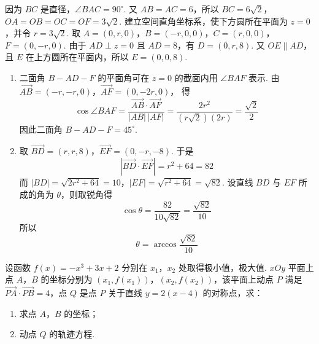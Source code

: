 \begin{solution}
因为 \(BC\) 是直径，\(\angle BAC=90^{\circ}\). 又 \(AB=AC=6\)，所以
\(BC=6\sqrt{2}\)，\(OA=OB=OC=OF=3\sqrt{2}\).
建立空间直角坐标系，使下方圆所在平面为 \(z=0\)，并令 \(r=3\sqrt{2}\). 取
\(A=(0,r,0)\)，\(B=(-r,0,0)\)，\(C=(r,0,0)\)，\(F=(0,-r,0)\).
由于 \(AD\perp z=0\) 且 \(AD=8\)，有 \(D=(0,r,8)\). 又 \(OE\parallel AD\)，且 \(E\) 在上方圆所在平面内，所以 \(E=(0,0,8)\).

\begin{enumerate}
\item 二面角 \(B-AD-F\) 的平面角可在 \(z=0\) 的截面内用 \(\angle BAF\) 表示. 由
\(\overrightarrow{AB}=(-r,-r,0)\)，\(\overrightarrow{AF}=(0,-2r,0)\)，
得
\[
\cos\angle BAF
=\frac{\overrightarrow{AB}\cdot\overrightarrow{AF}}{|AB|\,|AF|}
=\frac{2r^2}{(r\sqrt{2})(2r)}
=\frac{\sqrt{2}}{2}
\]
因此二面角 \(B-AD-F=45^{\circ}\).

\item 取
\(\overrightarrow{BD}=(r,r,8)\)，\(\overrightarrow{EF}=(0,-r,-8)\).
于是
\[
\left|\overrightarrow{BD}\cdot\overrightarrow{EF}\right|
=r^2+64=82
\]
而 \(|BD|=\sqrt{2r^2+64}=10\)，\(|EF|=\sqrt{r^2+64}=\sqrt{82}\).
设直线 \(BD\) 与 \(EF\) 所成的角为 \(\theta\)，则取锐角得
\[
\cos\theta
=\frac{82}{10\sqrt{82}}
=\frac{\sqrt{82}}{10}
\]
所以
\[
\theta=\arccos\frac{\sqrt{82}}{10}
\]
\end{enumerate}
\end{solution}

\begin{problem}
设函数 \( f(x) = -x^3 + 3x + 2 \) 分别在 \(x_1\)，\(x_2\) 处取得极小值，极大值. \(xOy\) 平面上点 \(A\)，\(B\) 的坐标分别为 \((x_1, f(x_1))\)，\((x_2, f(x_2))\)，该平面上动点 \(P\) 满足 \( \overrightarrow{PA} \cdot \overrightarrow{PB} = 4 \)，点 \(Q\) 是点 \(P\) 关于直线 \( y = 2(x - 4) \) 的对称点，求：

\begin{enumerate}
\item 求点 \(A\)，\(B\) 的坐标；
\item 动点 \(Q\) 的轨迹方程.
\end{enumerate}
\end{problem}

